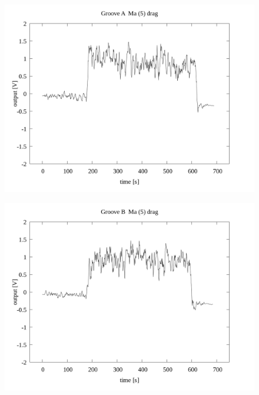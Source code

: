 \documentclass[a4paper]{jsarticle}
\begin{document}
\begin{figure}[htbp]
    \footnotesize
    \begin{center}
        \includegraphics[width=140mm]{../../../../33_result/210806/moving_average/5/drag/01/Groove_A_ma(5)_drag_01.png}
    \end{center}
\end{figure}

\begin{figure}[htbp]
    \footnotesize
    \begin{center}
        \includegraphics[width=140mm]{../../../../33_result/210806/moving_average/5/drag/01/Groove_B_ma(5)_drag_01.png}
    \end{center}
\end{figure}
\end{document}
